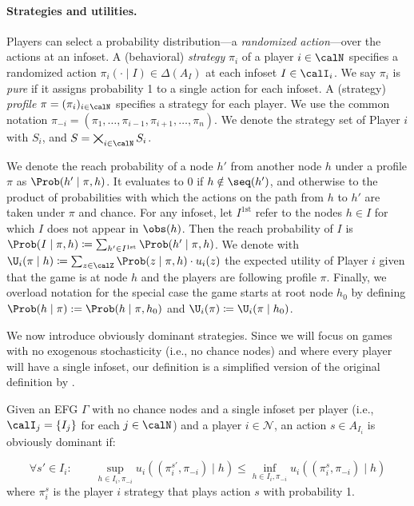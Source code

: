 \paragraph{Strategies and utilities.}

Players can select a probability distribution---a \emph{randomized action}---over the actions at an infoset. A (behavioral) \emph{strategy} $\pi_i$ of a player $i \in \calN$ specifies a randomized action $\pi_i(\cdot \mid I) \in \Delta(A_I)$ at each infoset $I \in \calI_i$. We say $\pi_i$ is \emph{pure} if it assigns probability 1 to a single action for each infoset. A (strategy) \emph{profile} $\pi = (\pi_i)_{i \in \calN}$ specifies a strategy for each player. We use the common notation $\pi_{-i} = (\pi_1, \dots, \pi_{i-1}, \pi_{i+1}, \dots, \pi_n)$. We denote the strategy set of Player $i$ with $S_i$, and $S = \bigtimes_{i \in \calN} S_i$.

We denote the reach probability of a node $h'$ from another node $h$ under a profile $\pi$ as $\Prob(h' \mid \pi, h)$. It evaluates to $0$ if $h \notin \seq(h')$, and otherwise to the product of probabilities with which the actions on the path from $h$ to $h'$ are taken under $\pi$ and chance. For any infoset, let $I^{\text{1st}}$ refer to the nodes $h\in I$ for which $I$ does not appear in $\obs(h)$. Then the reach probability of $I$ is $\Prob(I\mid \pi, h)\coloneqq \sum_{h' \in I^{\text{1st}}}\Prob(h' \mid \pi, h)$. We denote with $\U_i(\pi \mid h) \coloneqq \sum_{z \in \calZ} \Prob(z \mid \pi, h) \cdot u_i(z)$ the expected utility of Player $i$ given that the game is at node $h$ and the players are following profile $\pi$. Finally, we overload notation for the special case the game starts at root node $h_0$ by defining $\Prob(h \mid \pi) := \Prob(h \mid \pi, h_0)$ and $\U_i(\pi) \coloneqq \U_i(\pi \mid h_0)$.

We now introduce obviously dominant strategies. Since we will focus on games with no exogenous stochasticity (i.e., no chance nodes) and where every player will have a single infoset, our definition is a simplified version of the original definition by \citet{Li17:Obviously}.

\begin{definition}
Given an EFG $\Gamma$ with no chance nodes and a single infoset per player (i.e., $\calI_j =\{I_j\}$ for each $j \in \calN$) and a player $i \in \mathcal{N}$, an action $s \in A_{I_i}$ is obviously dominant if:

\[
\forall s' \in I_i: \quad \quad
\sup_{h \in I_i, \pi_{-i}} u_i((\pi_i^{s'}, \pi_{-i}) \mid h) \leq \inf_{h \in I_i, \pi_{-i}} u_i((\pi_i^{s}, \pi_{-i}) \mid h )
\]
where $\pi_i^s$ is the player $i$ strategy that plays action $s$ with probability 1. 
\end{definition}

